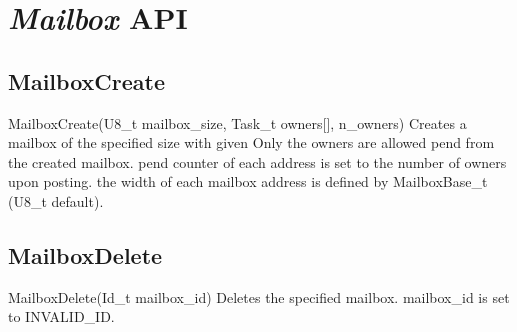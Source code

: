 \section{\textit{Mailbox} API}

\subsection{MailboxCreate}
\label{func:MailboxCreate}
\begin{pdfunction}
{MailboxCreate(U8\_t mailbox\_size, Task\_t owners[],  n\_owners) }
{ 
Creates a mailbox of the specified size with given 
Only the owners are allowed pend from the created mailbox. 
pend counter of each address is set to the number of owners upon 
posting.
the width of each mailbox address is defined by MailboxBase\_t (U8\_t 
default). }
\end{pdfunction}

\subsection{MailboxDelete}
\label{func:MailboxDelete}
\begin{pdfunction}
{MailboxDelete(Id\_t mailbox\_id) }
{ 
Deletes the specified mailbox. mailbox\_id is set to INVALID\_ID. }
\end{pdfunction}

